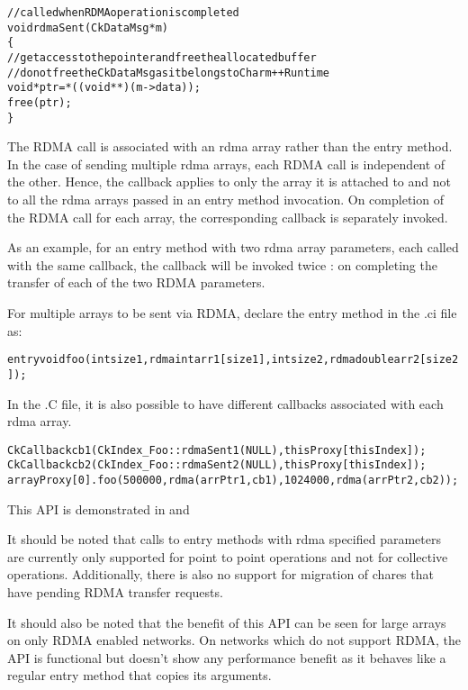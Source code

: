 \begin{alltt}
//called when RDMA operation is completed
void rdmaSent(CkDataMsg *m)
\{
  //get access to the pointer and free the allocated buffer
  //do not free the CkDataMsg as it belongs to Charm++ Runtime
  void *ptr = *((void **)(m->data));
  free(ptr);
\}
\end{alltt}

The RDMA call is associated with an rdma array rather than the entry method.
In the case of sending multiple rdma arrays, each RDMA call is independent of the other.
Hence, the callback applies to only the array it is attached to and not to all the rdma
arrays passed in an entry method invocation. On completion of the RDMA call for each
array, the corresponding callback is separately invoked.

As an example, for an entry method with two rdma array parameters, each called with the same
callback, the callback will be invoked twice : on completing the transfer of each of the two
RDMA parameters.

\vspace{0.1in}
\noindent
For multiple arrays to be sent via RDMA, declare the entry method in the .ci file as:

\begin{alltt}
entry void foo (int size1, rdma int arr1[size1], int size2, rdma double arr2[size2]);
\end{alltt}

In the .C file, it is also possible to have different callbacks associated with each rdma array.
\begin{alltt}
CkCallback cb1(CkIndex_Foo::rdmaSent1(NULL), thisProxy[thisIndex]);
CkCallback cb2(CkIndex_Foo::rdmaSent2(NULL), thisProxy[thisIndex]);
arrayProxy[0].foo(500000, rdma(arrPtr1, cb1), 1024000, rdma(arrPtr2, cb2));
\end{alltt}

This API is demonstrated in  and 

\vspace{0.1in}
\noindent
It should be noted that calls to entry methods with rdma specified parameters are
currently only supported for point to point operations and not for collective operations.
Additionally, there is also no support for migration of chares that have pending RDMA transfer
requests.

\vspace{0.1in}
\noindent
It should also be noted that the benefit of this API can be seen for large arrays on
only RDMA enabled networks. On networks which do not support RDMA, the API is functional
but doesn't show any performance benefit as it behaves like a regular entry method that
copies its arguments.

